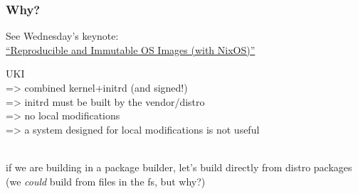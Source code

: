 \documentclass[]{beamer}
\newcommand\pp\pause
\begin{document}
\begin{frame}
  \frametitle{Why?}

  \pp

  See Wednesday's keynote:\\
  \href{https://cfp.all-systems-go.io/all-systems-go-2024/talk/MRDURE/}
       {``Reproducible and Immutable OS Images\pp{} (with NixOS)''}
  \\\pp

  UKI
  \\\pp
  => combined kernel+initrd (and signed!)
  \\\pp
  => initrd must be built by the vendor/distro
  \\\pp
  => no local modifications
  \\\pp
  => a system designed for local modifications is not useful
  \\\quad
  \\\pp

  if we are building in a package builder, let's build directly from distro packages\\
    (we \textit{could} build from files in the fs, but why?)
\end{frame}
\end{document}
